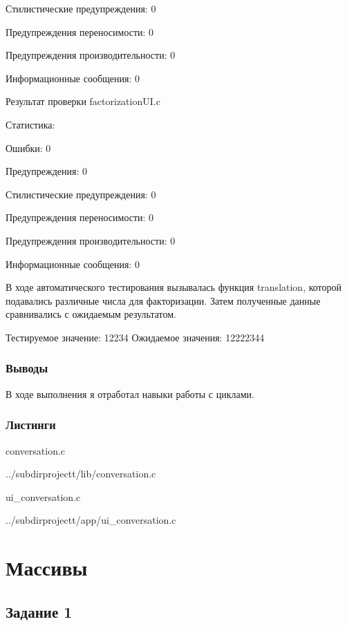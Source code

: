 \documentclass[12pt,a4paper]{report}
\begin{document}
	Стилистические предупреждения:	0
	
	Предупреждения переносимости:	0
	
	Предупреждения производительности:	0
	
	Информационные сообщения:	0
	
	
	\vspace{\baselineskip}
	
	
	Результат проверки factorizationUI.c 
	
	Статистика:
	
	Ошибки:	0
	
	Предупреждения:	0
	
	Стилистические предупреждения:	0
	
	Предупреждения переносимости:	0
	
	Предупреждения производительности:	0
	
	Информационные сообщения:	0
	
	

	\vspace{\baselineskip}
	
	В ходе автоматического тестирования  вызывалась функция translation, которой подавались различные числа для факторизации. Затем полученные данные сравнивались с ожидаемым результатом. 
	 
	 \vspace{\baselineskip}
 Тестируемое значение: 
	12234
Ожидаемое значения: 
	12222344

\subsection{Выводы}
В ходе выполнения я отработал навыки работы с циклами.
\subsection*{Листинги}
conversation.c

{../subdirprojectt/lib/conversation.c}

\vspace{\baselineskip}

ui_conversation.c

{../subdirprojectt/app/ui_conversation.c}

\chapter{Массивы}
\section{Задание 1}
\end{document}
